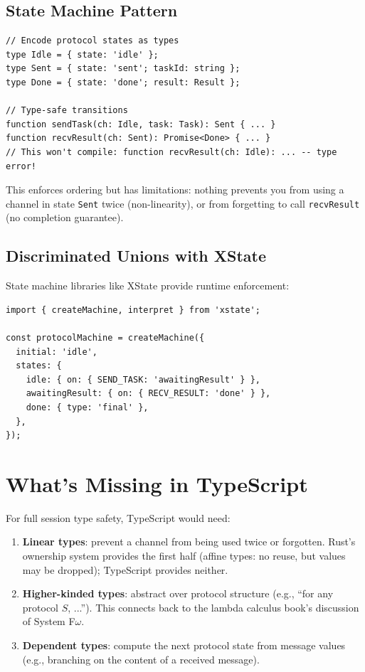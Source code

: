 \documentclass[11pt, a4paper, oneside]{book}
\newcommand{\lc}[1]{\texttt{#1}}
\begin{document}
\subsection{State Machine Pattern}

\begin{tsbox}
\begin{verbatim}
// Encode protocol states as types
type Idle = { state: 'idle' };
type Sent = { state: 'sent'; taskId: string };
type Done = { state: 'done'; result: Result };

// Type-safe transitions
function sendTask(ch: Idle, task: Task): Sent { ... }
function recvResult(ch: Sent): Promise<Done> { ... }
// This won't compile: function recvResult(ch: Idle): ... -- type error!
\end{verbatim}
\end{tsbox}

This enforces ordering but has limitations: nothing prevents you from using
a channel in state \lc{Sent} twice (non-linearity), or from forgetting to
call \lc{recvResult} (no completion guarantee).

\subsection{Discriminated Unions with XState}

State machine libraries like XState provide runtime enforcement:

\begin{tsbox}
\begin{verbatim}
import { createMachine, interpret } from 'xstate';

const protocolMachine = createMachine({
  initial: 'idle',
  states: {
    idle: { on: { SEND_TASK: 'awaitingResult' } },
    awaitingResult: { on: { RECV_RESULT: 'done' } },
    done: { type: 'final' },
  },
});
\end{verbatim}
\end{tsbox}

\section{What's Missing in TypeScript}

For full session type safety, TypeScript would need:

\begin{enumerate}[nosep]
\item \textbf{Linear types}: prevent a channel from being used twice or
  forgotten. Rust's ownership system provides the first half (affine types:
  no reuse, but values may be dropped); TypeScript provides neither.
\item \textbf{Higher-kinded types}: abstract over protocol structure
  (e.g., ``for any protocol $S$, ...'').
  This connects back to the lambda calculus book's discussion of System
  F$\omega$.
\item \textbf{Dependent types}: compute the next protocol state from message
  values (e.g., branching on the content of a received message).
\end{enumerate}
\end{document}
